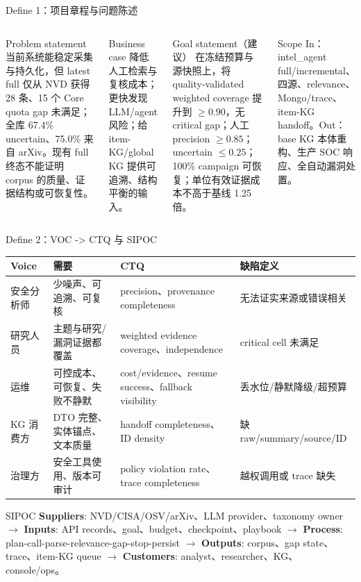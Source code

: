 \begin{frame}{Define 1：项目章程与问题陈述}
\begin{columns}[T,onlytextwidth]
\begin{block}{Problem statement}
当前系统能稳定采集与持久化，但 latest full 仅从 NVD 获得 28 条、15 个 Core quota gap 未满足；全库 67.4\% uncertain、75.0\% 来自 arXiv。现有 full 终态不能证明 corpus 的质量、证据结构或可恢复性。
\end{block}
\begin{block}{Business case}
降低人工检索与复核成本；更快发现 LLM/agent 风险；给 item-KG/global KG 提供可追溯、结构平衡的输入。
\end{block}
\begin{block}{Goal statement（建议）}
在冻结预算与源快照上，将 quality-validated weighted coverage 提升到 $\ge0.90$，无 critical gap；人工 precision $\ge0.85$；uncertain $\le0.25$；100\% campaign 可恢复；单位有效证据成本不高于基线 1.25 倍。
\end{block}
\begin{block}{Scope}
In：intel\_agent full/incremental、四源、relevance、Mongo/trace、item-KG handoff。Out：base KG 本体重构、生产 SOC 响应、全自动漏洞处置。
\end{block}
\end{columns}
\end{frame}

\begin{frame}{Define 2：VOC -> CTQ 与 SIPOC}
\scriptsize
\begin{tabularx}{\textwidth}{p{} p{} X p{}}
\toprule
Voice & 需要 & CTQ & 缺陷定义 \\
\midrule
安全分析师 & 少噪声、可追溯、可复核 & precision、provenance completeness & 无法证实来源或错误相关 \\
研究人员 & 主题与研究/漏洞证据都覆盖 & weighted evidence coverage、independence & critical cell 未满足 \\
运维 & 可控成本、可恢复、失败不静默 & cost/evidence、resume success、fallback visibility & 丢水位/静默降级/超预算 \\
KG 消费方 & DTO 完整、实体锚点、文本质量 & handoff completeness、ID density & 缺 raw/summary/source/ID \\
治理方 & 安全工具使用、版本可审计 & policy violation rate、trace completeness & 越权调用或 trace 缺失 \\
\bottomrule
\end{tabularx}

\vspace{0.5em}
\begin{block}{SIPOC}
\textbf{Suppliers}: NVD/CISA/OSV/arXiv、LLM provider、taxonomy owner
$\rightarrow$ \textbf{Inputs}: API records、goal、budget、checkpoint、playbook
$\rightarrow$ \textbf{Process}: plan-call-parse-relevance-gap-stop-persist
$\rightarrow$ \textbf{Outputs}: corpus、gap state、trace、item-KG queue
$\rightarrow$ \textbf{Customers}: analyst、researcher、KG、console/ops。
\end{block}
\end{frame}

